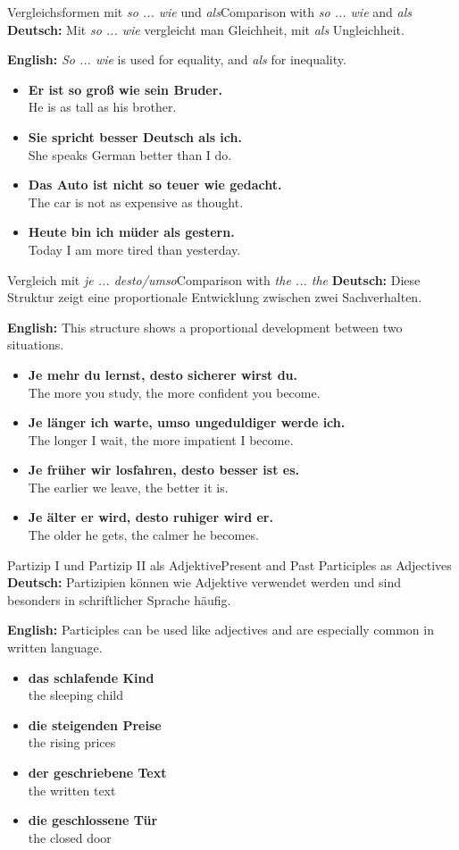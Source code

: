 \documentclass[a4paper,11pt]{article}
\newcommand{\GermanText}[1]{\textbf{Deutsch: }#1\par}
\newcommand{\EnglishText}[1]{{\color{SoftGray}\textbf{English: }#1\par}}
\newcommand{\ExampleItem}[2]{\item \textbf{#1}\\{\color{SoftGray}#2}}
\begin{document}
\begin{grammarentry}{Vergleichsformen mit \textit{so ... wie} und \textit{als}}{Comparison with \textit{so ... wie} and \textit{als}}
    \GermanText{Mit \textit{so ... wie} vergleicht man Gleichheit, mit \textit{als} Ungleichheit.}
    \EnglishText{\textit{So ... wie} is used for equality, and \textit{als} for inequality.}
    \begin{exbox}
        \begin{itemize}
            \ExampleItem{Er ist so groß wie sein Bruder.}{He is as tall as his brother.}
            \ExampleItem{Sie spricht besser Deutsch als ich.}{She speaks German better than I do.}
            \ExampleItem{Das Auto ist nicht so teuer wie gedacht.}{The car is not as expensive as thought.}
            \ExampleItem{Heute bin ich müder als gestern.}{Today I am more tired than yesterday.}
        \end{itemize}
    \end{exbox}
\end{grammarentry}

\begin{grammarentry}{Vergleich mit \textit{je ... desto/umso}}{Comparison with \textit{the ... the}}
    \GermanText{Diese Struktur zeigt eine proportionale Entwicklung zwischen zwei Sachverhalten.}
    \EnglishText{This structure shows a proportional development between two situations.}
    \begin{exbox}
        \begin{itemize}
            \ExampleItem{Je mehr du lernst, desto sicherer wirst du.}{The more you study, the more confident you become.}
            \ExampleItem{Je länger ich warte, umso ungeduldiger werde ich.}{The longer I wait, the more impatient I become.}
            \ExampleItem{Je früher wir losfahren, desto besser ist es.}{The earlier we leave, the better it is.}
            \ExampleItem{Je älter er wird, desto ruhiger wird er.}{The older he gets, the calmer he becomes.}
        \end{itemize}
    \end{exbox}
\end{grammarentry}

\begin{grammarentry}{Partizip I und Partizip II als Adjektive}{Present and Past Participles as Adjectives}
    \GermanText{Partizipien können wie Adjektive verwendet werden und sind besonders in schriftlicher Sprache häufig.}
    \EnglishText{Participles can be used like adjectives and are especially common in written language.}
    \begin{exbox}
        \begin{itemize}
            \ExampleItem{das schlafende Kind}{the sleeping child}
            \ExampleItem{die steigenden Preise}{the rising prices}
            \ExampleItem{der geschriebene Text}{the written text}
            \ExampleItem{die geschlossene Tür}{the closed door}
        \end{itemize}
    \end{exbox}
\end{grammarentry}
\end{document}
